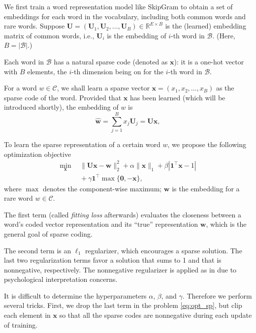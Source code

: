 \documentclass[11pt]{article}
\renewcommand{\vector}[1]{\bm{#1}}
\newcommand{\trans}[1]{#1^{\top}}
\begin{document}
We first train a word representation model like SkipGram \cite{word2vec} %
to obtain a set of embeddings for each word in the vocabulary, including both common words and rare words. Suppose $\vector{U}=(\vector{U}_1, \vector{U}_2, \dots, \vector{U}_B)
\in \mathbb{R}^{E\times B}$ is the (learned) embedding matrix of common words,
i.e., $\vector{U}_i$ is the embedding of $i$-th word in $\mathcal{B}$.
(Here, $B=|\mathcal{B}|$.)

Each word in $\mathcal{B}$ has a natural sparse code (denoted as $\vector{x}$): it is a one-hot vector
with $B$ elements, the $i$-th dimension being on
for the $i$-th word in $\mathcal{B}$.

For a word $w\in \mathcal{C}$, we shall learn a sparse vector $\vector{x} = (x_1, x_2, \dots, x_B)$ as the sparse code of the word. Provided that $\vector{x}$ has been learned (which will be introduced shortly), the embedding of $w$ is
\begin{equation}\label{eq:sp2dense}
\hat{\vector{w}} = \sum_{j=1}^B x_j \vector{U}_j = \vector{U}\vector{x},
\end{equation}

To learn the sparse representation of a certain word $w$,
we propose the following optimization objective
\begin{align}
   \min_{\vector x}\ \ & \| \vector{Ux} - \vector{w} \|_{2}^{2} + \alpha \|\vector{x}\|_1 +
   \beta |\trans{\vector{1}} \vector{x} - 1| \nonumber\\
   &{} + \gamma \trans{\vector{1}} \max \{\vector{0}, -\vector{x}\},  \label{eq:opt_sp}
\end{align}
where $\max$ denotes the component-wise maximum;  $\vector{w}$ is the embedding for a rare word $w\in \mathcal{C}$.

The first term (called \textit{fitting loss} afterwards) evaluates the closeness between a word's coded vector representation and its ``true'' representation $\vector{w}$, which is the general goal of sparse coding.

The second term is an $\ell_1$ regularizer,
which encourages a sparse solution.
The last two regularization terms favor a solution that sums to 1 and
that is nonnegative, respectively.
The nonnegative regularizer is applied as in  due to psychological interpretation concerns.

It is difficult to determine the hyperparameters $\alpha$, $\beta$, and $\gamma$.
Therefore we perform several tricks. First, we drop the last term
in the problem \eqref{eq:opt_sp}, but clip each element in $\vector{x}$ so that all the sparse codes are nonnegative during each update of training.
\end{document}
